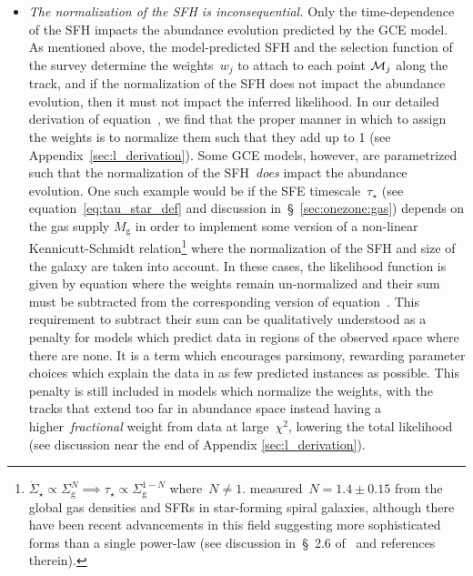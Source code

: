 \documentclass[ms.tex]{subfiles}
\begin{document}
\begin{itemize}
\begin{itemize}
		\item \textit{The normalization of the SFH is inconsequential.}
		Only the time-dependence of the SFH impacts the abundance evolution
		predicted by the GCE model.
		As mentioned above, the model-predicted SFH and the selection function
		of the survey determine the weights~$w_j$ to attach to each point
		$\mathcal{M}_j$ along the track, and if the normalization of the SFH
		does not impact the abundance evolution, then it must not impact the
		inferred likelihood.
		In our detailed derivation of equation~, we find
		that the proper manner in which to assign the weights is to normalize
		them such that they add up to 1 (see Appendix~\ref{sec:l_derivation}).
		Some GCE models, however, are parametrized such that the normalization
		of the SFH~\textit{does} impact the abundance evolution.
		One such example would be if the SFE
		timescale~$\tau_\star$ (see equation~\ref{eq:tau_star_def} and
		discussion in~\S~\ref{sec:onezone:gas}) depends on the gas supply
		$M_\text{g}$ in order to implement some version of a non-linear
		Kennicutt-Schmidt relation\footnote{
			$\dot{\Sigma}_\star \propto \Sigma_\text{g}^N \implies \tau_\star
			\propto \Sigma_\text{g}^{1 - N}$ where~$N \neq 1$.
			\citet{kennicutt1998} measured~$N = 1.4 \pm 0.15$ from the global
			gas densities and SFRs in star-forming spiral galaxies, although
			there have been recent advancements in this field suggesting more
			sophisticated forms than a single power-law (see discussion
			in~\S~2.6 of~\citealt{Johnson2021} and references therein).
		} where the normalization of the SFH and size of the galaxy are taken
		into account.
		In these cases, the likelihood function is given by equation
		 where the weights remain un-normalized and
		their sum must be subtracted from the corresponding version of
		equation~.
		This requirement to subtract their sum can be qualitatively understood
		as a penalty for models which predict data in regions of the observed
		space where there are none.
		It is a term which encourages parsimony, rewarding parameter choices
		which explain the data in as few predicted instances as possible.
		This penalty is still included in models which normalize the weights,
		with the tracks that extend too far in abundance space instead having a
		higher~\textit{fractional} weight from data at large~$\chi^2$, lowering
		the total likelihood (see discussion near the end of Appendix
		\ref{sec:l_derivation}).

\end{itemize}
\end{itemize}
\end{document}
